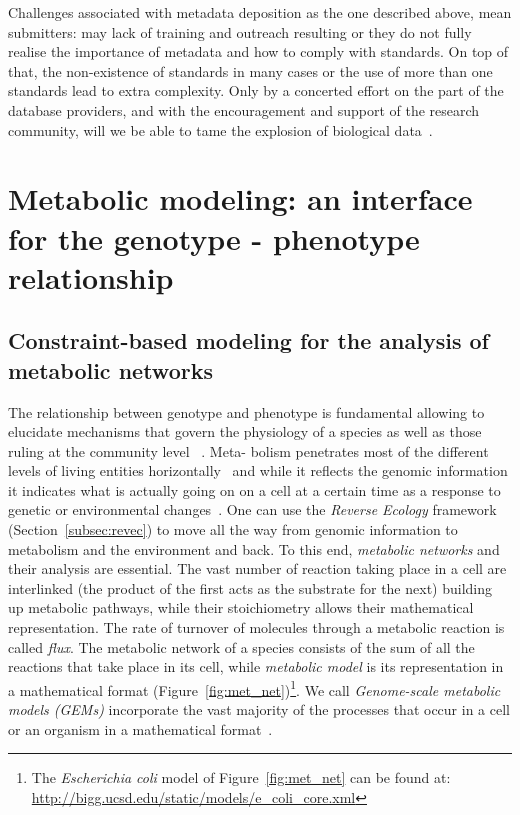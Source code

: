       Challenges associated with metadata deposition 
      as the one described above,
      mean submitters: 
      may lack of training and outreach resulting 
      or they do not fully realise the importance of metadata and 
      how to comply with standards.
      On top of that, the non-existence of standards in many cases 
      or the use of more than one standards lead to extra complexity.
      Only by a concerted effort on the part of the database providers, and with the encouragement and support of the research community, will we be able to tame the explosion of biological data~\cite{stein2003integrating}.
\section{Metabolic modeling: an interface for the genotype - phenotype relationship}


   \subsection{Constraint-based modeling for the analysis of metabolic networks}
   \label{subesec:modling}

      The relationship between genotype and phenotype is fundamental allowing to elucidate 
      mechanisms that govern the physiology of a species as well as those 
      ruling at the community level
      ~\cite{morris2020linking}.
      Meta-
      bolism penetrates most of the different levels of living entities horizontally~\cite{schramski2015metabolic} and 
      while it reflects the genomic information it indicates 
      what is actually going on on a cell at a certain time
      as a response to genetic or environmental changes~\cite{lima2021role}.
      One can use the \textit{Reverse Ecology} framework (Section~\ref{subsec:revec})
      to move all the way from genomic information to metabolism and the environment and back.
      To this end, \textit{metabolic networks} and their analysis are essential. 
      The vast number of reaction taking place in a cell are interlinked 
      (the product of the first acts as the substrate for the next) 
      building up metabolic pathways,
      while their stoichiometry allows their mathematical representation. 
      The rate of turnover of molecules through a metabolic reaction is called \textit{flux}.
      The metabolic network of a species consists of the sum of all the reactions that 
      take place in its cell,
      while \textit{metabolic model} is its representation in a mathematical format (Figure~\ref{fig:met_net})\footnote{               
         The \textit{Escherichia coli} model of Figure~\ref{fig:met_net} can be found at:\\
            \href{http://bigg.ucsd.edu/static/models/e_coli_core.xml}{http://bigg.ucsd.edu/static/models/e\_coli\_core.xml}
      }. 
      We call \textit{Genome-scale metabolic models (GEMs)} incorporate the vast majority of the 
      processes that occur in a cell or an organism in a mathematical format~\cite{feist2009reconstruction}.



